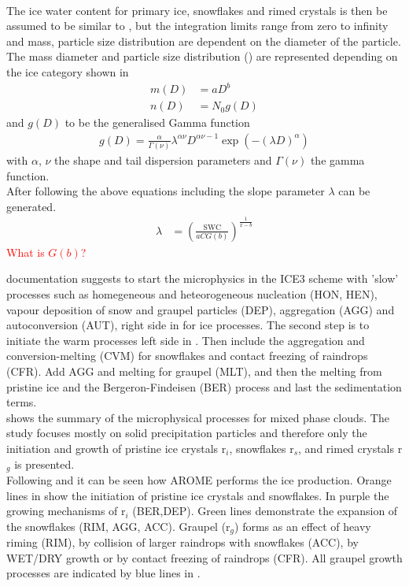 \\
The ice water content for primary ice, snowflakes and rimed crystals is then be assumed to be similar to , but the integration limits range from zero to infinity and mass, particle size distribution are dependent on the diameter of the particle. The mass diameter and particle size distribution () are represented depending on the ice category shown in 
\begin{align}
	m(D) & = aD^b 	\label{eq:mass_diameter} \\
	n(D) & = N_0 g(D)	\label{eq:PSD_MEPS}
\end{align}
and $g(D)$ to be the generalised Gamma function 
\begin{align}
	g(D) = \frac{\alpha}{\Gamma(\nu)} \lambda^{\alpha \nu} D^{\alpha \nu -1} \exp\left( -(\lambda D)^\alpha \right)
\end{align}
with $\alpha$, $\nu$ the shape and tail dispersion parameters and $\Gamma(\nu)$ the gamma function. 
\\
After following the above equations including  the slope parameter $\lambda$ can be generated.
\begin{align}
	\lambda & = \left( \frac{\text{SWC}}{aCG(b)}\right)^{\frac{1}{x-b}}
\end{align}
\textcolor{red}{What is $G(b)$?}
%

\newline
\cite{meteo_france_meso-nh_2009} documentation suggests to start the microphysics in the ICE3 scheme with 'slow' processes such as homegeneous and heteorogeneous nucleation (HON, HEN), vapour deposition of snow and graupel particles (DEP), aggregation (AGG) and autoconversion (AUT), right side in  for ice processes. The second step is to initiate the warm processes left side in . Then include the aggregation and conversion-melting (CVM) for snowflakes and contact freezing of raindrops (CFR). Add AGG and melting for graupel (MLT), and then the melting from pristine ice  and the Bergeron-Findeisen (BER) process and last the sedimentation terms.  \\
 shows the summary of the microphysical processes for mixed phase clouds. The study focuses mostly on solid precipitation particles and therefore only the initiation and growth of pristine ice crystals r$_i$, snowflakes r$_s$, and rimed crystals r$_g$ is presented. 
\\
Following \cite{pinty_mixed-phased_1998} and  it can be seen how AROME performs the ice production. Orange lines in  show the initiation of pristine ice crystals and snowflakes. In purple the growing mechanisms of r$_i$ (BER,DEP). Green lines demonstrate the expansion of the snowflakes (RIM, AGG, ACC). Graupel (r$_g$) forms as an effect of heavy riming (RIM), by collision of larger raindrops with snowflakes (ACC), by WET/DRY growth or by contact freezing of raindrops (CFR). All graupel growth processes are indicated by blue lines in . 

